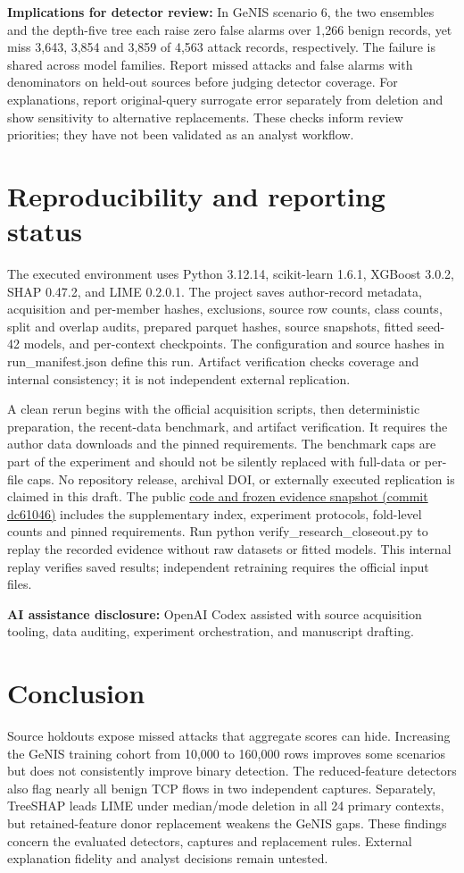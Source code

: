 \documentclass[journal,letterpaper]{IEEEtran}
\begin{document}
\textbf{Implications for detector review:} In GeNIS scenario 6, the two ensembles and the depth-five tree each raise zero false alarms over 1,266 benign records, yet miss 3,643, 3,854 and 3,859 of 4,563 attack records, respectively. The failure is shared across model families. Report missed attacks and false alarms with denominators on held-out sources before judging detector coverage. For explanations, report original-query surrogate error separately from deletion and show sensitivity to alternative replacements. These checks inform review priorities; they have not been validated as an analyst workflow.

\section{Reproducibility and reporting status}
The executed environment uses Python 3.12.14, scikit-learn 1.6.1, XGBoost 3.0.2, SHAP 0.47.2, and LIME 0.2.0.1. The project saves author-record metadata, acquisition and per-member hashes, exclusions, source row counts, class counts, split and overlap audits, prepared parquet hashes, source snapshots, fitted seed-42 models, and per-context checkpoints. The configuration and source hashes in run\_manifest.json define this run. Artifact verification checks coverage and internal consistency; it is not independent external replication.

A clean rerun begins with the official acquisition scripts, then deterministic preparation, the recent-data benchmark, and artifact verification. It requires the author data downloads and the pinned requirements. The benchmark caps are part of the experiment and should not be silently replaced with full-data or per-file caps. No repository release, archival DOI, or externally executed replication is claimed in this draft. The public \href{https://github.com/Jubayed-Sahel/Intrusion-Detection-System-Research/tree/dc61046}{code and frozen evidence snapshot (commit dc61046)} includes the supplementary index, experiment protocols, fold-level counts and pinned requirements. Run python verify\_research\_closeout.py to replay the recorded evidence without raw datasets or fitted models. This internal replay verifies saved results; independent retraining requires the official input files.

\textbf{AI assistance disclosure:} OpenAI Codex assisted with source acquisition tooling, data auditing, experiment orchestration, and manuscript drafting.

\section{Conclusion}
Source holdouts expose missed attacks that aggregate scores can hide. Increasing the GeNIS training cohort from 10,000 to 160,000 rows improves some scenarios but does not consistently improve binary detection. The reduced-feature detectors also flag nearly all benign TCP flows in two independent captures. Separately, TreeSHAP leads LIME under median/mode deletion in all 24 primary contexts, but retained-feature donor replacement weakens the GeNIS gaps. These findings concern the evaluated detectors, captures and replacement rules. External explanation fidelity and analyst decisions remain untested.
\end{document}
